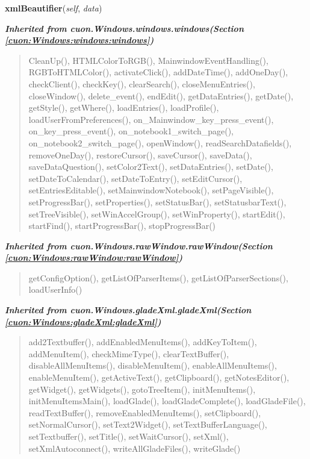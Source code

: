     \vspace{0.5ex}

\hspace{.8\funcindent}\begin{boxedminipage}{\funcwidth}

    \raggedright \textbf{xmlBeautifier}(\textit{self}, \textit{data})

\setlength{\parskip}{2ex}
\setlength{\parskip}{1ex}
    \end{boxedminipage}


\large{\textbf{\textit{Inherited from cuon.Windows.windows.windows\textit{(Section \ref{cuon:Windows:windows:windows})}}}}

\begin{quote}
CleanUp(), HTMLColorToRGB(), MainwindowEventHandling(), RGBToHTMLColor(), activateClick(), addDateTime(), addOneDay(), checkClient(), checkKey(), clearSearch(), closeMenuEntries(), closeWindow(), delete\_event(), endEdit(), getDataEntries(), getDate(), getStyle(), getWhere(), loadEntries(), loadProfile(), loadUserFromPreferences(), on\_Mainwindow\_key\_press\_event(), on\_key\_press\_event(), on\_notebook1\_switch\_page(), on\_notebook2\_switch\_page(), openWindow(), readSearchDatafields(), removeOneDay(), restoreCursor(), saveCursor(), saveData(), saveDataQuestion(), setColor2Text(), setDataEntries(), setDate(), setDateToCalendar(), setDateToEntry(), setEditCursor(), setEntriesEditable(), setMainwindowNotebook(), setPageVisible(), setProgressBar(), setProperties(), setStatusBar(), setStatusbarText(), setTreeVisible(), setWinAccelGroup(), setWinProperty(), startEdit(), startFind(), startProgressBar(), stopProgressBar()
\end{quote}

\large{\textbf{\textit{Inherited from cuon.Windows.rawWindow.rawWindow\textit{(Section \ref{cuon:Windows:rawWindow:rawWindow})}}}}

\begin{quote}
getConfigOption(), getListOfParserItems(), getListOfParserSections(), loadUserInfo()
\end{quote}

\large{\textbf{\textit{Inherited from cuon.Windows.gladeXml.gladeXml\textit{(Section \ref{cuon:Windows:gladeXml:gladeXml})}}}}

\begin{quote}
add2Textbuffer(), addEnabledMenuItems(), addKeyToItem(), addMenuItem(), checkMimeType(), clearTextBuffer(), disableAllMenuItems(), disableMenuItem(), enableAllMenuItems(), enableMenuItem(), getActiveText(), getClipboard(), getNotesEditor(), getWidget(), getWidgets(), gotoTreeItem(), initMenuItems(), initMenuItemsMain(), loadGlade(), loadGladeComplete(), loadGladeFile(), readTextBuffer(), removeEnabledMenuItems(), setClipboard(), setNormalCursor(), setText2Widget(), setTextBufferLanguage(), setTextbuffer(), setTitle(), setWaitCursor(), setXml(), setXmlAutoconnect(), writeAllGladeFiles(), writeGlade()
\end{quote}

